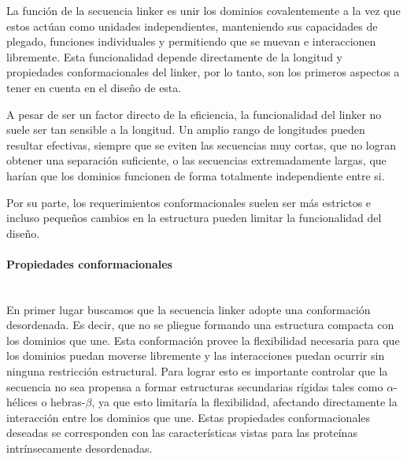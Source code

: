 

La función de la secuencia linker es unir los dominios covalentemente a la vez que estos actúan como unidades independientes, manteniendo sus capacidades de plegado, funciones individuales y 
permitiendo que se muevan e interaccionen libremente. 
Esta funcionalidad depende directamente de la longitud y propiedades conformacionales del linker, por lo tanto, son los primeros aspectos a tener en cuenta en el diseño de esta.

A pesar de ser un factor directo de la eficiencia\cite{robinson1998optimizing}, la funcionalidad del linker no suele ser tan sensible a la longitud. Un amplio rango de longitudes pueden resultar efectivas, siempre 
que se eviten las secuencias muy cortas, que no logran obtener una separación suficiente, o las secuencias extremadamente largas, que harían que los dominios funcionen de forma totalmente independiente entre si.

Por su parte, los requerimientos conformacionales suelen ser más estrictos e incluso pequeños cambios en la estructura pueden limitar la funcionalidad del diseño.

\paragraph{Propiedades conformacionales} \hspace{0pt} \\ \indent 
En primer lugar buscamos que la secuencia linker adopte una conformación desordenada. Es decir, que no se pliegue formando una estructura compacta con los dominios que une.
Esta conformación provee la flexibilidad necesaria para que los dominios puedan moverse libremente y las interacciones puedan ocurrir sin ninguna restricción estructural.
Para lograr esto es importante controlar que la secuencia no sea propensa a formar estructuras secundarias rígidas tales como $\alpha$-hélices o hebras-$\beta$, ya que esto
limitaría la flexibilidad, afectando directamente la interacción entre los dominios que une.
Estas propiedades conformacionales deseadas se corresponden con las características vistas para las proteínas intrínsecamente desordenadas. 

